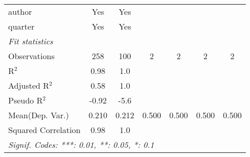 \begin{tabular}{lcccccc}
   author                        & Yes            & Yes            &     &     &     & \\  
   quarter                       & Yes            & Yes            &     &     &     & \\  
   \midrule
   \emph{Fit statistics}\\
   Observations                  & 258            & 100            & 2   & 2   & 2   & 2\\  
   R$^2$                         & 0.98           & 1.0            &     &     &     & \\  
   Adjusted R$^2$                & 0.58           & 1.0            &     &     &     & \\  
   Pseudo R$^2$                  & -0.92          & -5.6           &     &     &     & \\  
Mean(Dep. Var.) & 0.210 & 0.212 & 0.500 & 0.500 & 0.500 & 0.500 \\
   Squared Correlation           & 0.98           & 1.0            &     &     &     & \\  
   \midrule \midrule
   \multicolumn{7}{l}{\emph{Signif. Codes: ***: 0.01, **: 0.05, *: 0.1}}\\
\end{tabular}
\par\endgroup

